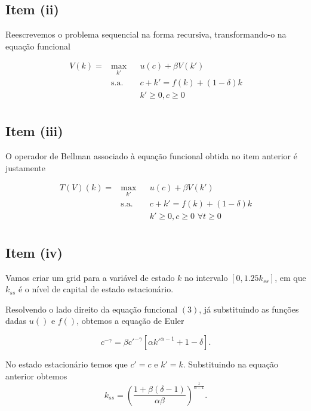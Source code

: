 \documentclass{article}
\begin{document}
\subsection*{Item (ii)}

Reescrevemos o problema sequencial na forma recursiva, transformando-o na equação funcional

\begin{equation}
\begin{aligned}
V(k) = & \max_{k'} & & u(c) + \beta V(k') \\
& \text{s.a.} & &  c + k' = f(k) + (1-\delta) k \\
& & &  k' \geq 0, c \geq 0 \,\, \\
\end{aligned}
\end{equation}

\subsection*{Item (iii)}

O operador de Bellman associado à equação funcional obtida no item anterior é justamente

\begin{equation}
\begin{aligned}
T(V)(k) = & \max_{k'} & & u(c) + \beta V(k') \\
& \text{s.a.} & &  c + k' = f(k) + (1-\delta) k \\
& & &  k' \geq 0, c \geq 0 \,\, \forall t \geq 0  \\
\end{aligned}
\end{equation}

\subsection*{Item (iv)}

Vamos criar um grid para a variável de estado $k$ no intervalo $[0, 1.25 k_{ss}]$, em que $k_{ss}$ é o nível
de capital de estado estacionário. 

Resolvendo o lado direito da equação funcional $(3)$, já substituindo as funções dadas $u()$ e $f()$, 
obtemos a equação de Euler

$$ c^{-\gamma} = \beta c'^{-\gamma} [\alpha k'^{\alpha-1} + 1 - \delta].$$

No estado estacionário temos que $c' = c$ e $k' = k$. Substituindo na equação anterior obtemos
\begin{equation}
k_{ss} = \left( \frac{1 + \beta (\delta - 1)}{\alpha \beta} \right)^{\frac{1}{\alpha - 1}}.
\end{equation}
\end{document}
